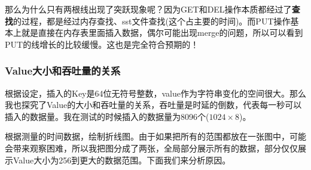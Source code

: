 \documentclass[fontset=windows]{article}
\begin{document}
那么为什么只有两根线出现了突跃现象呢？因为GET和DEL操作本质都经过了\textbf{查找}的过程，都是经过内存查找、sst文件查找(这个占主要的时间)。而PUT操作基本上就是直接在内存表里面插入数据，偶尔可能出现merge的问题，所以可以看到PUT的线增长的比较缓慢。这也是完全符合预期的！


\subsubsection{Value大小和吞吐量的关系}

根据设定，插入的Key是64位无符号整数，value作为字符串变化的空间很大。那么我也探究了Value的大小和吞吐量的关系，吞吐量是时延的倒数，代表每一秒可以插入的数据量。我在测试的时候插入的数据量为8096个($1024  \times 8$)。

\begin{table}[h]
  \centering
  \caption{吞吐量和Value大小的关系}
\end{table}

根据测量的时间数据，绘制折线图。由于如果把所有的范围都放在一张图中，可能会带来观察困难，所以我把图分成了两张，全局部分展示所有的数据，部分仅仅展示Value大小为256到更大的数据范围。下面我们来分析原因。
\end{document}
